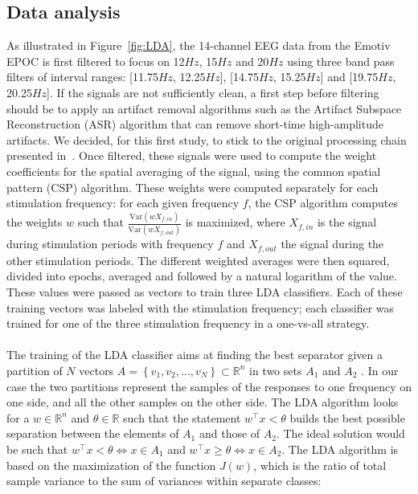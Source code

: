 \documentclass[smallextended]{svjour3}
\begin{document}
\subsection{Data analysis}
As illustrated in Figure~\ref{fig:LDA}, the 14-channel EEG data from the Emotiv EPOC is first filtered to focus on 12$Hz$, 15$Hz$ and 20$Hz$ using three band pass filters of interval ranges: [11.75$Hz$, 12.25$Hz$], [14.75$Hz$, 15.25$Hz$] and [19.75$Hz$, 20.25$Hz$]. 
If the signals are not sufficiently clean, a first step before filtering should be to apply an artifact removal algorithms such as the Artifact Subspace Reconstruction (ASR) algorithm that can remove short-time high-amplitude artifacts. We decided, for this first study, to stick to the original processing chain presented in~\cite{openvibeSSVEP}.
Once filtered, these signals were used to compute the weight coefficients for the spatial averaging of the signal, using the common spatial pattern (CSP) algorithm. These weights were computed separately for each stimulation frequency: for each given frequency $f$, the CSP algorithm computes the weights $w$ such that $\frac{\textrm{Var}(w X_{f,in})}{\textrm{Var}(w X_{f,out})}$ is maximized, where $X_{f,in}$ is the signal during stimulation periods with frequency $f$ and $X_{f,out}$ the signal during the other stimulation periods. 
The different weighted averages were then squared, divided into epochs, averaged and followed by a natural logarithm of the value. These values were passed as vectors to train three LDA classifiers. 
Each of these training vectors was labeled with the stimulation frequency; each classifier was trained for one of the three stimulation frequency in a one-vs-all strategy. \\
\\
The training of the LDA classifier aims at finding the best separator given a partition of $N$ vectors $A = \left\{v_1, v_2, \hdots, v_N\right\} \subset \mathbb R^n$ in two sets $A_1$ and $A_2$ . In our case the two partitions represent the samples of the responses to one frequency on one side, and all the other samples on the other side.
The LDA algorithm looks for a $w\in\mathbb R^n$ and $\theta\in\mathbb R$ such that the statement $w^\top x < \theta$ builds the best possible separation between the elements of $A_1$ and those of $A_2$. The ideal solution would be such that $w^\top x < \theta \Leftrightarrow x\in A_1$ and $w^\top x \geq \theta \Leftrightarrow x\in A_2$.
The LDA algorithm is based on the maximization of the function $J(w)$, which is the ratio of total sample variance to the sum of variances within separate classes: 
\end{document}
